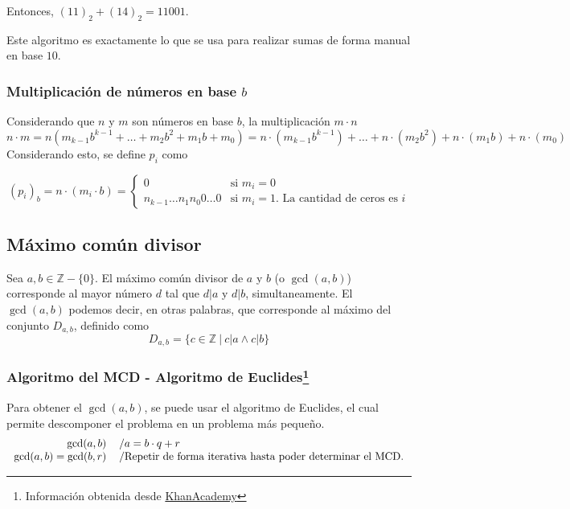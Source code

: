 \documentclass[../main.tex]{subfiles}
\begin{document}
Entonces, $(11)_2 + (14)_2 = 11001$.

Este algoritmo es exactamente lo que se usa para realizar sumas de forma manual en base $10$.

\subsubsection[Multiplicación de números en base b]{Multiplicación de números en base $b$}
Considerando que $n$ y $m$ son números en base $b$, la multiplicación $m \cdot n$
\[ n \cdot m = n(m_{k-1} b^{k-1} + \ldots + m_2 b^2 + m_1 b + m_0) = n \cdot (m_{k-1} b^{k-1}) + \ldots + n \cdot (m_2 b^2) + n \cdot (m_1 b) + n \cdot (m_0) \]
Considerando esto, se define $p_i$ como

\begin{equation*}
    (p_i)_b = n \cdot (m_i \cdot b) =
        \begin{cases}
            0 & \text{si } m_i = 0\\
            n_{k-1} \ldots n_1 n_0 0 \ldots 0 & \text{si } m_i = 1 \text{. La cantidad de ceros es } i
        \end{cases}
\end{equation*}

\subsection{Máximo común divisor}
Sea $a,b \in \mathds{Z} - \{0\}$. El máximo común divisor de $a$ y $b$ (o $\gcd(a,b)$) corresponde al mayor número $d$ tal que $d|a$ y $d|b$, simultaneamente. El $\gcd(a,b)$ podemos decir, en otras palabras, que corresponde al máximo del conjunto $D_{a,b}$, definido como
\[ D_{a,b} = \{ c \in \mathds{Z}\ |\ c|a \wedge c|b \} \]

\subsubsection[Algoritmo del MCD - Algoritmo de Euclides]{Algoritmo del MCD - Algoritmo de Euclides\footnote{Información obtenida desde \href{https://es.khanacademy.org/computing/computer-science/cryptography/modarithmetic/a/the-euclidean-algorithm}{KhanAcademy}}}
Para obtener el $\gcd(a,b)$, se puede usar el algoritmo de Euclides, el cual permite descomponer el problema en un problema más pequeño.
\[
    \begin{tabular}{rl}
        $\gcd(a,b)$ & /$a = b \cdot q + r$\\
        $\gcd(a,b) = \gcd(b,r)$ & /Repetir de forma iterativa hasta poder determinar el MCD.      
    \end{tabular}
\]
\end{document}

